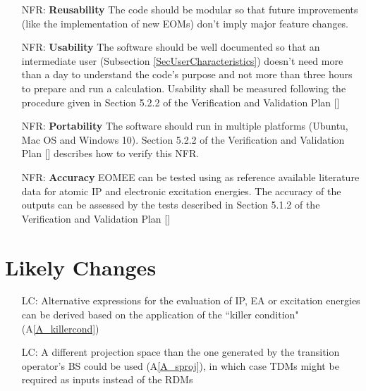 \documentclass[12pt]{article}
\newcommand{\aref}[1]{A\ref{#1}}
\newcounter{nfrnum} %
\newcounter{lcnum} %
\begin{document}
\noindent \begin{itemize}

\item[NFR\refstepcounter{nfrnum}\thenfrnum \label{NFR_Reusability}:]
\textbf{Reusability} The code should be modular so that future improvements 
(like the implementation of new EOMs) don't imply major feature changes.

\item[NFR\refstepcounter{nfrnum}\thenfrnum \label{NFR_Usability}:] 
\textbf{Usability} The software should be well documented so that an 
intermediate user (Subsection \ref{SecUserCharacteristics}) doesn't need 
more than a day 
to understand the code's purpose and not more than three hours to prepare and 
run a calculation. Usability shall be measured following the procedure given in 
Section 5.2.2 of the Verification and Validation Plan [\cite{VnV2020}]

\item[NFR\refstepcounter{nfrnum}\thenfrnum \label{NFR_Portability}:]
\textbf{Portability} The software should run in multiple platforms (Ubuntu, Mac 
OS and Windows 10). Section 5.2.2 of the Verification and Validation Plan 
[\cite{VnV2020}] describes how to verify this NFR.

\item[NFR\refstepcounter{nfrnum}\thenfrnum \label{NFR_Accuracy}:]
\textbf{Accuracy} EOMEE can be tested using as reference available literature 
data for atomic IP and electronic excitation energies. The accuracy of the 
outputs can be assessed by the tests described in Section 5.1.2 of the 
Verification and Validation Plan [\cite{VnV2020}]
\end{itemize}

\section{Likely Changes}    

\noindent \begin{itemize}

\item[LC\refstepcounter{lcnum}\thelcnum\label{LC_newEOMs}:] Alternative 
expressions for the evaluation of IP, EA or excitation energies can be derived 
based on the application of the ``killer condition" (\aref{A_killercond})

\item[LC\refstepcounter{lcnum}\thelcnum\label{LC_asymmetricEOMs}:] A different 
projection space than the one generated by the transition operator's BS could 
be used (\aref{A_sproj}), in which case TDMs might be required as inputs 
instead of the RDMs 



\end{itemize}
\end{document}
